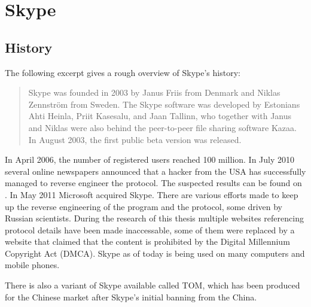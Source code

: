 \section{Skype}
\subsection{History}
The following excerpt\cite{wiki:skype} gives a rough overview of Skype's history:
\begin{quote}
Skype was founded in 2003 by Janus Friis from Denmark and Niklas Zennström from Sweden.
The Skype software was developed by Estonians Ahti Heinla, Priit Kasesalu, and Jaan Tallinn, 
who together with Janus and Niklas were also behind the peer-to-peer file sharing software 
Kazaa. In August 2003, the first public beta version was released.
\end{quote}
In April 2006, the number of registered users reached 100 million.
In July 2010 several online newspapers announced that a hacker from the USA
has successfully managed to reverse engineer the
protocol. The suspected results can be found on \cite{skype:source}.
In May 2011 Microsoft acquired Skype. There are various efforts made to 
keep up the reverse engineering of the program and the 
protocol, some driven by Russian scientists. During the research
of this thesis multiple websites referencing protocol details have been
made inaccessable, some of them were replaced by a website that claimed
that the content is prohibited by the Digital Millennium Copyright Act (DMCA).
Skype as of today is being used on many computers and mobile phones.

There is also a variant of Skype available called TOM, which has been produced
for the Chinese market after Skype's initial banning from the China.
